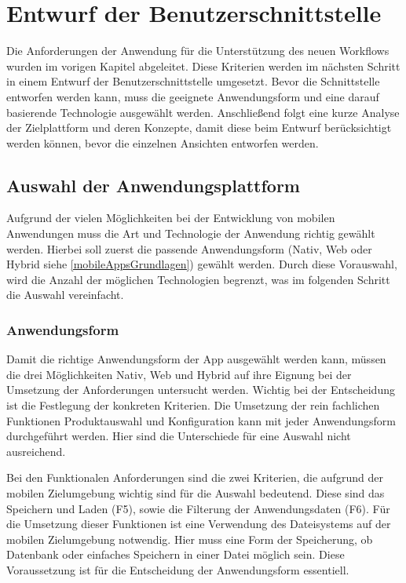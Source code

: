 \chapter{Entwurf der Benutzerschnittstelle}\label{chapter_4}
Die Anforderungen der Anwendung für die Unterstützung des neuen Workflows wurden im vorigen Kapitel abgeleitet. Diese Kriterien werden im nächsten Schritt in einem Entwurf der Benutzerschnittstelle umgesetzt. Bevor die Schnittstelle entworfen werden kann, muss die geeignete Anwendungsform und eine darauf basierende Technologie ausgewählt werden. Anschließend folgt eine kurze Analyse der Zielplattform und deren Konzepte, damit diese beim Entwurf berücksichtigt werden können, bevor die einzelnen Ansichten entworfen werden.

\section{Auswahl der Anwendungsplattform}
Aufgrund der vielen Möglichkeiten bei der Entwicklung von mobilen Anwendungen muss die Art und Technologie der Anwendung richtig gewählt werden. Hierbei soll zuerst die passende Anwendungsform (Nativ, Web oder Hybrid siehe \ref{mobileAppsGrundlagen}) gewählt werden. Durch diese Vorauswahl, wird die Anzahl der möglichen Technologien begrenzt, was im folgenden Schritt die Auswahl vereinfacht.


\subsection{Anwendungsform}
Damit die richtige Anwendungsform der App ausgewählt werden kann, müssen die drei Möglichkeiten Nativ, Web und Hybrid auf ihre Eignung bei der Umsetzung der Anforderungen untersucht werden. Wichtig bei der Entscheidung ist die Festlegung der konkreten Kriterien. 
Die Umsetzung der rein fachlichen Funktionen Produktauswahl und Konfiguration kann mit jeder Anwendungsform durchgeführt werden. Hier sind die Unterschiede für eine Auswahl nicht ausreichend. \par
Bei den  Funktionalen Anforderungen sind die zwei Kriterien, die aufgrund der mobilen Zielumgebung wichtig sind für die Auswahl bedeutend. Diese sind das Speichern und Laden (F5), sowie die Filterung der Anwendungsdaten (F6). Für die Umsetzung dieser Funktionen ist eine Verwendung des Dateisystems auf der mobilen Zielumgebung notwendig. Hier muss eine Form der Speicherung, ob Datenbank oder einfaches Speichern in einer Datei möglich sein. Diese Voraussetzung ist für die Entscheidung der Anwendungsform essentiell. \par

